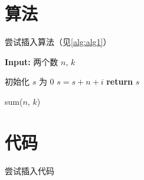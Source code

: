 \documentclass[openany,a4paper,12pt,oneside,AutoFakeBold]{book}%
\renewcommand{\COMMENT}[2][.5\linewidth]{%
  \leavevmode\hfill\makebox[#1][l]{//~#2}}
\begin{document}
\chapter{算法}
尝试插入算法（见\autoref{alg:alg1}）

\begin{algorithm}[h]
    \textbf{Input:} 两个数 $n$, $k$
    \begin{algorithmic}[1]
        \STATE 初始化 $s$ 为 $0$ \label{algline:init}
            \COMMENT{\textbf{循环}}
        \label{algline:for} 
        \STATE $s=s+n+i$
        \ENDIF 
        \ENDFOR \label{algline:endfor}
        \STATE \textbf{return} $s$ \label{algline:return} 
    \end{algorithmic}
    \caption{sum($n$, $k$)}
    \label{alg:alg1}
\end{algorithm}

\chapter{代码}
尝试插入代码
\end{document}
